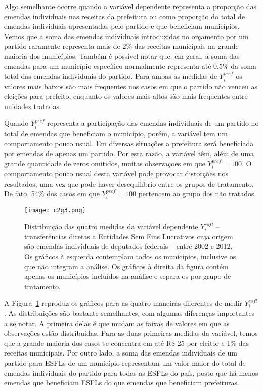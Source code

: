 Algo semelhante ocorre quando a variável dependente representa a proporção das emendas individuais nas receitas da prefeitura ou como proporção do total de emendas individuais apresentadas pelo partido e que beneficiam municípios. Vemos que a soma das emendas individuais introduzidas no orçamento por um partido raramente representa mais de 2\% das receitas municipais na grande maioria dos municípios. Também é possível notar que, em geral, a soma das emendas para um município específico normalmente representa até 0.5\% da soma total das emendas individuais do partido. Para ambas as medidas de $Y_{i}^{pref}$ os valores mais baixos são mais frequentes nos casos em que o partido não venceu as eleições para prefeito, enquanto os valores mais altos são mais frequentes entre unidades tratadas.

Quando $Y_{i}^{pref}$ representa a participação das emendas individuais de um partido no total de emendas que beneficiam o município, porém, a variável tem um comportamento pouco usual. Em diversas situações a prefeitura será beneficiada por emendas de apenas um partido. Por esta razão, a variável têm, além de uma grande quantidade de zeros omitidos, muitas observaçoes em que $Y_{i}^{pref}=100$. O comportamento pouco usual desta variável pode provocar distorções nos resultados, uma vez que pode haver desequilíbrio entre os grupos de tratamento. De fato, 54\% dos casos em que $Y_{i}^{pref}=100$ pertencem ao grupo dos não tratados.

\begin{figure}[htp]
	\centering
	\texttt{[image: c2g3.png]}
	\caption{Distribuição das quatro medidas da variável dependente $Y_{i}^{esfl}$ -- transferências diretas a Entidades Sem Fins Lucrativos cuja origem são emendas individuais de deputados federais -- entre 2002 e 2012. Os gráficos à esquerda contemplam todos os municípios, inclusive os que não integram a análise. Os gráficos à direita da figura contém apenas os municípios incluídos na análise e separa-os por grupo de tratamento.}
	\label{fig:c2g3}
\end{figure}

A Figura~\ref{fig:c2g3} reproduz os gráficos para as quatro maneiras diferentes de medir $Y_{i}^{esfl}$. As distribuições são bastante semelhantes, com algumas diferenças importantes a se notar. A primeira delas é que mudam as faixas de valores em que as observações estão distribuídas. Para as duas primeiras medidas da variável, temos que a grande maioria dos casos se concentra em até R\$ 25 por eleitor e 1\% das receitas municipais. Por outro lado, a soma das emendas individuais de um partido para ESFLs de um município representam um valor maior do total de emendas individuais do partido para todas as ESFLs do país, posto que há menos emendas que beneficiam ESFLs do que emendas que beneficiam prefeituras.

